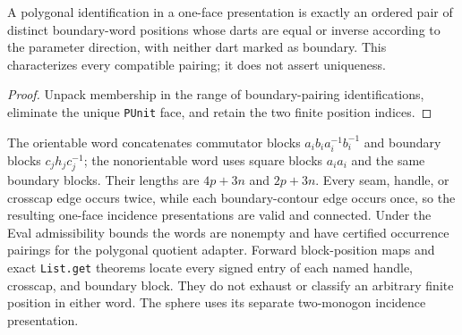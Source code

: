 \begin{lemma}
\label{moise:lem:one_face_pairing_positions}
\leanok
{}
A polygonal identification in a one-face presentation is exactly an ordered
pair of distinct boundary-word positions whose darts are equal or inverse
according to the parameter direction, with neither dart marked as boundary.
This characterizes every compatible pairing; it does not assert uniqueness.
\end{lemma}

\begin{proof}
\leanok
Unpack membership in the range of boundary-pairing identifications, eliminate
the unique \texttt{PUnit} face, and retain the two finite position indices.
\end{proof}

\begin{definition}
\label{moise:def:canonical_normal_form_complexes}
\leanok
{}
The orientable word concatenates commutator blocks
$a_i b_i a_i^{-1}b_i^{-1}$ and boundary blocks $c_jh_jc_j^{-1}$; the
nonorientable word uses square blocks $a_i a_i$ and the same boundary blocks.
Their lengths are $4p+3n$ and $2p+3n$. Every seam, handle, or crosscap edge
occurs twice, while each boundary-contour edge occurs once, so the resulting
one-face incidence presentations are valid and connected. Under the Eval
admissibility bounds the words are nonempty and have certified occurrence
pairings for the polygonal quotient adapter. Forward block-position maps and
exact \texttt{List.get} theorems locate every signed entry of each named
handle, crosscap, and boundary block. They do not exhaust or classify an
arbitrary finite position in either word. The sphere uses its separate
two-monogon incidence presentation.
\end{definition}


